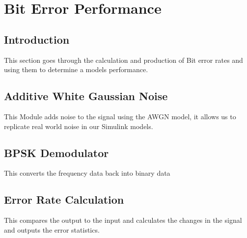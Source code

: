 \section{Bit Error Performance}{
    \subsection{Introduction}
    {
   		This section goes through the calculation and production of Bit error rates and using them to determine a models performance.
   	}
   	\subsection{Additive White Gaussian Noise}
   {
   		This Module adds noise to the signal using the AWGN model, it allows us to replicate real world noise in our Simulink models.
	}
	\subsection{BPSK Demodulator}
	{
		This converts the frequency data back into binary data
	}
	\subsection{Error Rate Calculation}
	{
		This compares the output to the input and calculates the changes in the signal and outputs the error statistics.
	}
}